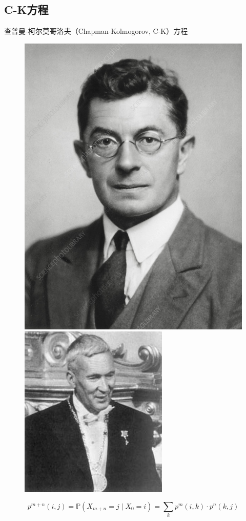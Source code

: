 \documentclass[t]{beamer}
\renewcommand{\Pr}{\mathbb{P}}
\begin{document}
\subsection{C-K方程}
\begin{frame}{查普曼-柯尔莫哥洛夫（Chapman-Kolmogorov, C-K）方程}
        \begin{figure}[htp]
            \includegraphics[height=.4\textheight]{fig/chapman.jpg}
            \quad 
            \includegraphics[height=.4\textheight]{fig/kolmogorov.jpg}
            \centering
            \end{figure}
            \begin{equation*}
                p^{m+n}(i,j)=\Pr(X_{m+n}=j\;|\;X_0=i)=\sum_k p^m(i,k)\cdot p^n(k,j)
                \end{equation*}
        
\end{frame}
\end{document}

